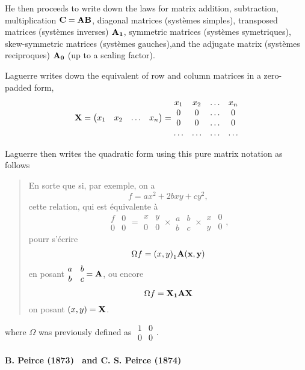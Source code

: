 He then proceeds to write down the laws for matrix addition, subtraction,
multiplication $\bf C = \bf A \bf B$,
diagonal matrices (systèmes simples), transposed matrices (systèmes inverses)
$\bf A_1$, symmetric matrices (systèmes symetriques), skew-symmetric matrices
(systèmes gauches),and the adjugate matrix (systèmes reciproques) $\bf A_0$
(up to a scaling factor).

Laguerre writes down the equivalent of row and column matrices in a zero-padded form,
\[
\bf X = \begin{pmatrix}x_1&x_2&\ldots&x_n\end{pmatrix} = \begin{matrix}
x_1&x_2&\ldots&x_n\\
0&0&\ldots&0\\
0&0&\ldots&0\\
\ldots&\ldots&\ldots&\ldots
\end{matrix}
\]

Laguerre then writes the quadratic form using this pure matrix notation as follows

\begin{quote}
En sorte que si, par exemple, on a
\[
f = ax^2 + 2bxy + cy^2,
\]
cette relation, qui est équivalente à
\[
    \begin{matrix}f&0\\0&0\end{matrix} =
    \begin{matrix}x&y\\0&0\end{matrix} \times
    \begin{matrix}a&b\\b&c\end{matrix} \times
    \begin{matrix}x&0\\y&0\end{matrix},
\]
pourr s'écrire
\[
    \Omega f = {(x, y)}_1 \bf A (x, y)
\]
en posant $\begin{matrix}a&b\\b&c\end{matrix}=\bf A$,
ou encore
\[
    \Omega f = \bf X_1 \bf A \bf X
\]
on posant $(x, y) = \bf X$.
\end{quote}
where $\Omega$ was previously defined as $\begin{matrix}1&0\\0&0\end{matrix}$.



\paragraph{B. Peirce (1873)~\cite{Peirce1873} and C. S. Peirce (1874)~\cite{Peirce1874}}

